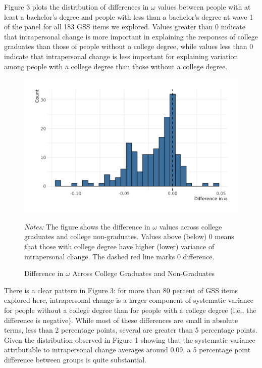 \documentclass[
  12pt,
]{article}
\begin{document}
Figure 3 plots the distribution of differences in \(\omega\) values
between people with at least a bachelor's degree and people with less
than a bachelor's degree at wave 1 of the panel for all 183 GSS items we
explored. Values greater than 0 indicate that intrapersonal change is
more important in explaining the responses of college graduates than
those of people without a college degree, while values less than 0
indicate that intrapersonal change is less important for explaining
variation among people with a college degree than those without a
college degree.

\begin{figure}[hbt]
\begin{center}
\caption{Difference in $\omega$ Across College Graduates and Non-Graduates}

\includegraphics[width=450px]{../figures/figure_3}

\end{center}
\footnotesize{\textit{Notes:} The figure shows the difference in $\omega$ values across college graduates and college non-graduates. Values above (below) 0 means that those with college degree have higher (lower) variance of intrapersonal change. The dashed red line marks 0 difference.}
\end{figure}

There is a clear pattern in Figure 3: for more than 80 percent of GSS
items explored here, intrapersonal change is a larger component of
systematic variance for people without a college degree than for people
with a college degree (i.e., the difference is negative). While most of
these differences are small in absolute terms, less than 2 percentage
points, several are greater than 5 percentage points. Given the
distribution observed in Figure 1 showing that the systematic variance
attributable to intrapersonal change averages around 0.09, a 5
percentage point difference between groups is quite substantial.
\end{document}
